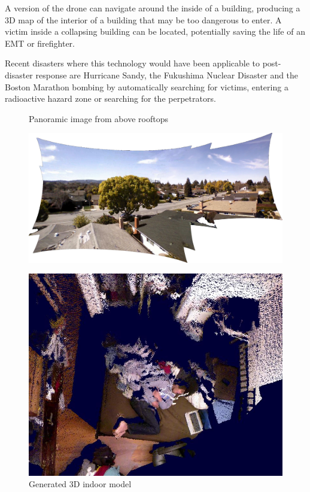 \noindent
A version of the drone can navigate around the inside of a building, producing a 3D map of the interior of a building that may be too dangerous to enter. A victim inside a collapsing building can be located, potentially saving the life of an EMT or firefighter.

\noindent
Recent disasters where this technology would have been applicable to post-disaster response are Hurricane Sandy, the Fukushima Nuclear Disaster and the Boston Marathon bombing by automatically searching for victims, entering a radioactive hazard zone or searching for the perpetrators.

\begin{figure}[h]
	\begin{minipage}{.55\textwidth}
		 \caption{Panoramic image from above rooftops}
		 \label{fig:StellingStitch}
		 \centering
		 	\includegraphics[width=.95\linewidth]{illustrations/maps/stelling}
	\end{minipage}
	\begin{minipage}{.45\textwidth}
 		\caption{Generated 3D indoor model}
 		\label{fig:BedPointCloud}
 		\centering
 			\includegraphics[width=.95\linewidth]{illustrations/clouds/bed2}
	\end{minipage}
\end{figure}

